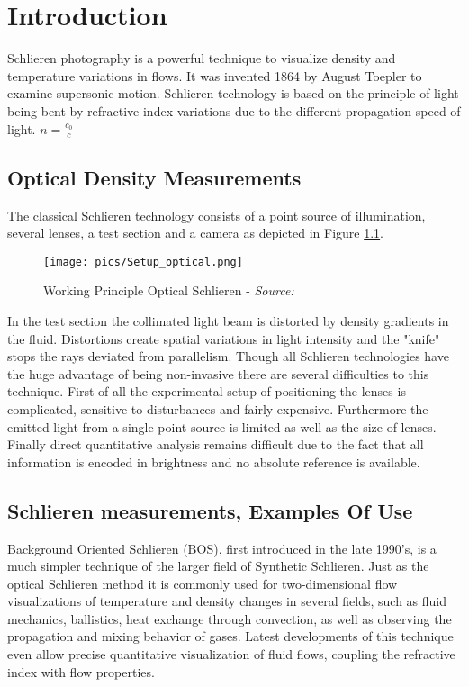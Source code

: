 \chapter{Introduction}\label{sec:introduction}
Schlieren photography is a powerful technique to visualize density and temperature variations in flows. It was invented 1864 by August Toepler to examine supersonic motion. Schlieren technology is based on the principle of light being bent by refractive index variations due to the different propagation speed of light. $n=\frac{c_0}{c}$ 

\section{Optical Density Measurements}
The classical Schlieren technology consists of a point source of illumination, several lenses, a test section and a camera as depicted in Figure \ref{pic:Setup_optical}. \\
\begin{figure}[H]
\texttt{[image: pics/Setup\_optical.png]}
\caption{Working Principle Optical Schlieren - \emph{Source:} \cite{thomas2009synthetic}}
\label{pic:Setup_optical}
\end{figure}

In the test section the collimated light beam is distorted by density gradients in the fluid. Distortions create spatial variations in light intensity and the "knife" stops the rays deviated from parallelism. Though all Schlieren technologies have the huge advantage of being non-invasive there are several difficulties to this technique. First of all the experimental setup of positioning the lenses is complicated, sensitive to disturbances and fairly expensive. Furthermore the emitted light from a single-point source is limited as well as the size of lenses. Finally direct quantitative analysis remains difficult due to the fact that all information is encoded in brightness and no absolute reference is available.

\section{Schlieren measurements, Examples Of Use}

Background Oriented Schlieren (BOS), first introduced in the late 1990's, is a much simpler technique of the larger field of Synthetic Schlieren. Just as the optical Schlieren method it is commonly used for two-dimensional flow visualizations of temperature and density changes in several fields, such as fluid mechanics, ballistics, heat exchange through convection, as well as observing the propagation and mixing behavior of gases. Latest developments of this technique even allow precise quantitative visualization of fluid flows, coupling the refractive index with flow properties.

